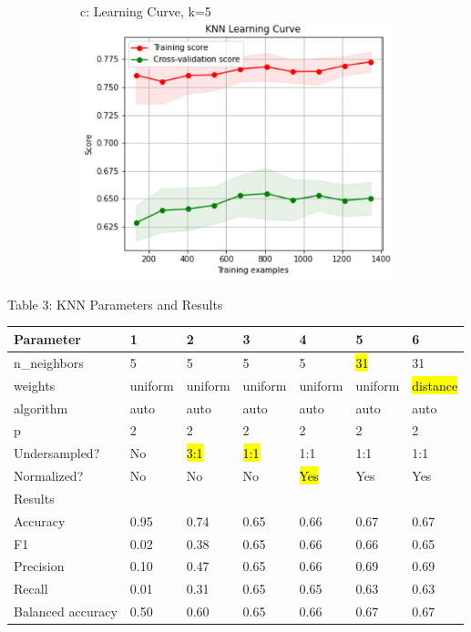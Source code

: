 \documentclass{article}
\begin{document}
\begin{figure}
\begin{subfigure}{.34\textwidth}
	\end{subfigure}
	\begin{subfigure}{.35\textwidth}
		\centering
		c: Learning Curve, k=5
		\includegraphics[width=\linewidth]{poland_knn_learning_curve_k_5.png}
		
	\end{subfigure}
	
	\label{fig:test}
\end{figure}


\begin{table}
	
	\centering
	Table 3: KNN Parameters and Results\\
	\begin{tabular}{ l l l l l l l }
		\hline
		Parameter & 1 & 2 & 3 & 4 & 5 & 6\\
		\hline
		n\_neighbors & 5 & 5 & 5 & 5 & \hl{31} & 31 \\
		weights & uniform & uniform & uniform & uniform & uniform & \hl{distance} \\
		algorithm & auto & auto & auto & auto & auto & auto \\
		p & 2 & 2 & 2 & 2 & 2 & 2\\
		Undersampled? & No & \hl{3:1} & \hl{1:1} & 1:1 & 1:1 & 1:1 \\
		Normalized? & No & No & No & \hl{Yes} & Yes & Yes\\
		\hline
		Results & & & & & \\
		\hline
		Accuracy & 0.95 & 0.74 & 0.65 & 0.66 & 0.67 & 0.67\\
		F1 & 0.02 & 0.38 & 0.65 &  0.66 & 0.66 & 0.65\\
		Precision & 0.10 & 0.47 & 0.65 & 0.66 & 0.69 & 0.69\\
		Recall & 0.01 & 0.31 & 0.65 &  0.65 & 0.63 & 0.63\\
		Balanced accuracy & 0.50 & 0.60 & 0.65 & 0.66 & 0.67 & 0.67\\
		
		\hline 
	\end{tabular}
\end{table}
\end{document}
